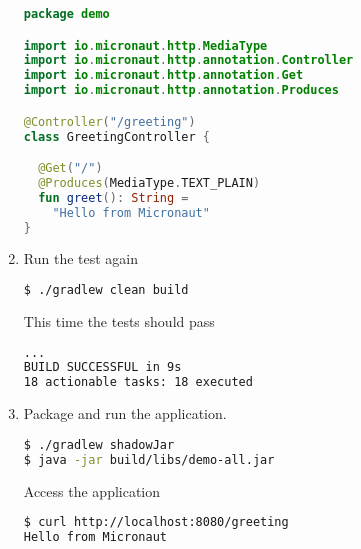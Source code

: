 \begin{enumerate}
	      \begin{lstlisting}[language=Kotlin]
package demo

import io.micronaut.http.MediaType
import io.micronaut.http.annotation.Controller
import io.micronaut.http.annotation.Get
import io.micronaut.http.annotation.Produces

@Controller("/greeting")
class GreetingController {

  @Get("/")
  @Produces(MediaType.TEXT_PLAIN)
  fun greet(): String =
    "Hello from Micronaut"
}
	      \end{lstlisting}

	\item Run the test again

	      \begin{lstlisting}[language=bash]
$ ./gradlew clean build
	      \end{lstlisting}

	      This time the tests should pass

	      \begin{lstlisting}[language=bash]
...
BUILD SUCCESSFUL in 9s
18 actionable tasks: 18 executed
	      \end{lstlisting}

	\item Package and run the application.

	      \begin{lstlisting}[language=bash]
$ ./gradlew shadowJar
$ java -jar build/libs/demo-all.jar
	      \end{lstlisting}

	      Access the application

	      \begin{lstlisting}[language=bash]
$ curl http://localhost:8080/greeting
Hello from Micronaut
	      \end{lstlisting}

\end{enumerate}

